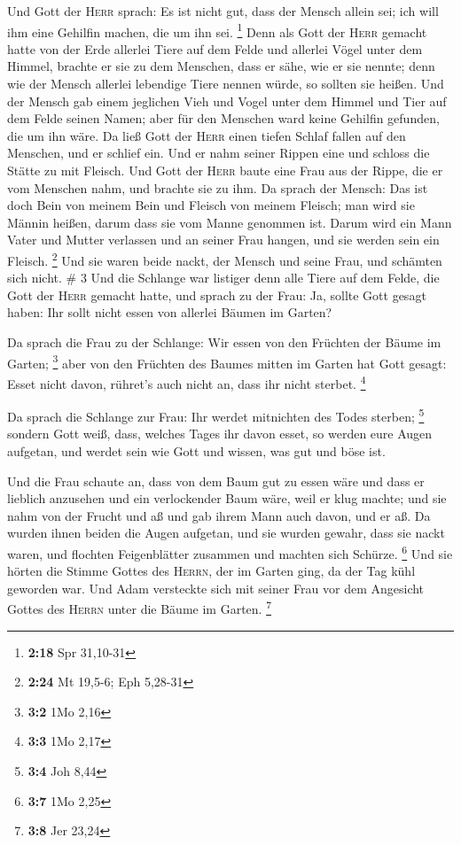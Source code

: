  Und Gott der \textsc{Herr} sprach: Es ist nicht gut,
dass der Mensch allein sei; ich will ihm eine Gehilfin machen, die um
ihn sei. \footnote{\textbf{2:18} Spr 31,10-31}  Denn als
Gott der \textsc{Herr} gemacht hatte von der Erde allerlei Tiere auf dem
Felde und allerlei Vögel unter dem Himmel, brachte er sie zu dem
Menschen, dass er sähe, wie er sie nennte; denn wie der Mensch allerlei
lebendige Tiere nennen würde, so sollten sie heißen.  Und
der Mensch gab einem jeglichen Vieh und Vogel unter dem Himmel und Tier
auf dem Felde seinen Namen; aber für den Menschen ward keine Gehilfin
gefunden, die um ihn wäre.  Da ließ Gott der
\textsc{Herr} einen tiefen Schlaf fallen auf den Menschen, und er
schlief ein. Und er nahm seiner Rippen eine und schloss die Stätte zu
mit Fleisch.  Und Gott der \textsc{Herr} baute eine Frau
aus der Rippe, die er vom Menschen nahm, und brachte sie zu ihm.
 Da sprach der Mensch: Das ist doch Bein von meinem Bein
und Fleisch von meinem Fleisch; man wird sie Männin heißen, darum dass
sie vom Manne genommen ist.  Darum wird ein Mann Vater
und Mutter verlassen und an seiner Frau hangen, und sie werden sein ein
Fleisch. \footnote{\textbf{2:24} Mt 19,5-6; Eph 5,28-31} 
Und sie waren beide nackt, der Mensch und seine Frau, und schämten sich
nicht. \# 3  Und die Schlange war listiger denn alle Tiere
auf dem Felde, die Gott der \textsc{Herr} gemacht hatte, und sprach zu
der Frau: Ja, sollte Gott gesagt haben: Ihr sollt nicht essen von
allerlei Bäumen im Garten?

 Da sprach die Frau zu der Schlange: Wir essen von den
Früchten der Bäume im Garten; \footnote{\textbf{3:2} 1Mo 2,16}
 aber von den Früchten des Baumes mitten im Garten hat
Gott gesagt: Esset nicht davon, rühret's auch nicht an, dass ihr nicht
sterbet. \footnote{\textbf{3:3} 1Mo 2,17}

 Da sprach die Schlange zur Frau: Ihr werdet mitnichten
des Todes sterben; \footnote{\textbf{3:4} Joh 8,44} 
sondern Gott weiß, dass, welches Tages ihr davon esset, so werden eure
Augen aufgetan, und werdet sein wie Gott und wissen, was gut und böse
ist.

 Und die Frau schaute an, dass von dem Baum gut zu essen
wäre und dass er lieblich anzusehen und ein verlockender Baum wäre, weil
er klug machte; und sie nahm von der Frucht und aß und gab ihrem Mann
auch davon, und er aß.  Da wurden ihnen beiden die Augen
aufgetan, und sie wurden gewahr, dass sie nackt waren, und flochten
Feigenblätter zusammen und machten sich Schürze. \footnote{\textbf{3:7}
  1Mo 2,25}  Und sie hörten die Stimme Gottes des
\textsc{Herrn}, der im Garten ging, da der Tag kühl geworden war. Und
Adam versteckte sich mit seiner Frau vor dem Angesicht Gottes des
\textsc{Herrn} unter die Bäume im Garten. \footnote{\textbf{3:8} Jer
  23,24}

